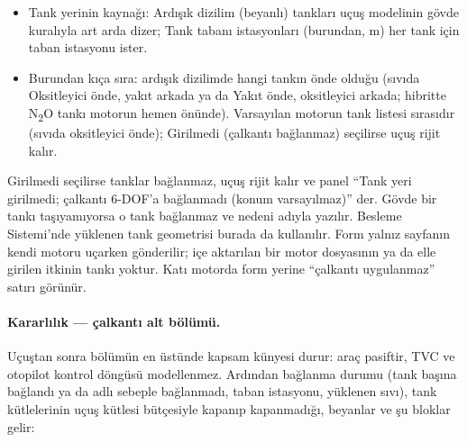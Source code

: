 \documentclass[11pt,a4paper]{article}
\newcommand{\ui}[1]{\textsf{#1}}
\begin{document}
\begin{itemize}[leftmargin=1.4em]
  \item \ui{Tank yerinin kaynağı}: \ui{Ardışık dizilim (beyanlı)} tankları
  uçuş modelinin gövde kuralıyla art arda dizer; \ui{Tank tabanı istasyonları
  (burundan, m)} her tank için taban istasyonu ister.
  \item \ui{Burundan kıça sıra}: ardışık dizilimde hangi tankın önde olduğu
  (sıvıda \ui{Oksitleyici önde, yakıt arkada} ya da \ui{Yakıt önde, oksitleyici
  arkada}; hibritte \ui{N\textsubscript{2}O tankı motorun hemen önünde}).
  Varsayılan motorun tank listesi sırasıdır (sıvıda oksitleyici önde);
  \ui{Girilmedi (çalkantı bağlanmaz)} seçilirse uçuş rijit kalır.
\end{itemize}

\ui{Girilmedi} seçilirse tanklar bağlanmaz, uçuş rijit kalır ve panel ``Tank yeri
girilmedi; çalkantı 6-DOF'a bağlanmadı (konum varsayılmaz)'' der. Gövde bir tankı
taşıyamıyorsa o tank bağlanmaz ve nedeni adıyla yazılır. Besleme
Sistemi'nde yüklenen tank geometrisi burada da kullanılır. Form yalnız sayfanın
kendi motoru uçarken gönderilir; içe aktarılan bir motor dosyasının ya da elle
girilen itkinin tankı yoktur. Katı motorda form yerine ``çalkantı uygulanmaz''
satırı görünür.

\paragraph{Kararlılık --- çalkantı alt bölümü.} Uçuştan sonra bölümün en
üstünde kapsam künyesi durur: araç pasiftir, TVC ve otopilot kontrol döngüsü
modellenmez. Ardından bağlanma durumu (tank başına bağlandı ya da adlı
sebeple bağlanmadı, taban istasyonu, yüklenen sıvı), tank kütlelerinin uçuş
kütlesi bütçesiyle kapanıp kapanmadığı, beyanlar ve şu bloklar gelir:
\end{document}
